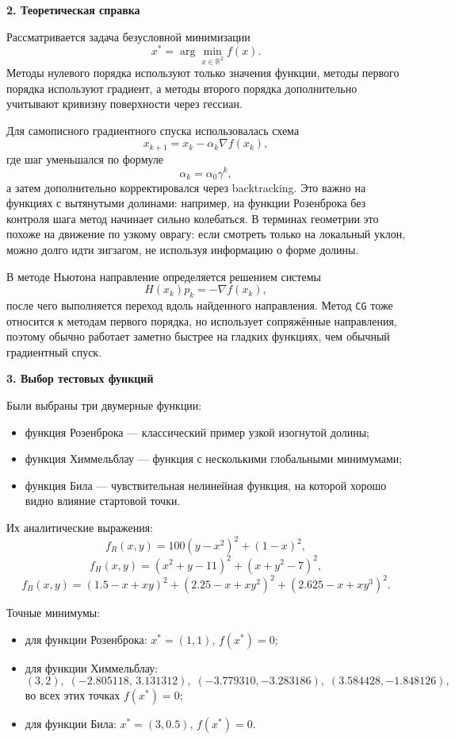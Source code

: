 \documentclass[12pt]{article}
\begin{document}
\begin{large}
\par \textbf{2. Теоретическая справка}

\par Рассматривается задача безусловной минимизации
\[
 x^* = \arg\min_{x \in \mathbb{R}^2} f(x).
\]
Методы нулевого порядка используют только значения функции, методы первого порядка используют градиент, а методы второго порядка дополнительно учитывают кривизну поверхности через гессиан.

\par Для самописного градиентного спуска использовалась схема
\[
 x_{k+1} = x_k - \alpha_k \nabla f(x_k),
\]
где шаг уменьшался по формуле
\[
\alpha_k = \alpha_0 \gamma^k,
\]
а затем дополнительно корректировался через backtracking. Это важно на функциях с вытянутыми долинами: например, на функции Розенброка без контроля шага метод начинает сильно колебаться. В терминах геометрии это похоже на движение по узкому оврагу: если смотреть только на локальный уклон, можно долго идти зигзагом, не используя информацию о форме долины.

\par В методе Ньютона направление определяется решением системы
\[
H(x_k)p_k = -\nabla f(x_k),
\]
после чего выполняется переход вдоль найденного направления. Метод \texttt{CG} тоже относится к методам первого порядка, но использует сопряжённые направления, поэтому обычно работает заметно быстрее на гладких функциях, чем обычный градиентный спуск.

\par \textbf{3. Выбор тестовых функций}

\par Были выбраны три двумерные функции:
\begin{itemize}
    \item функция Розенброка --- классический пример узкой изогнутой долины;
    \item функция Химмельблау --- функция с несколькими глобальными минимумами;
    \item функция Била --- чувствительная нелинейная функция, на которой хорошо видно влияние стартовой точки.
\end{itemize}

\par Их аналитические выражения:
\[
 f_{R}(x,y)=100(y-x^2)^2+(1-x)^2,
\]
\[
 f_{H}(x,y)=(x^2+y-11)^2+(x+y^2-7)^2,
\]
\[
 f_{B}(x,y)=(1.5-x+xy)^2+(2.25-x+xy^2)^2+(2.625-x+xy^3)^2.
\]

\par Точные минимумы:
\begin{itemize}
    \item для функции Розенброка: $x^*=(1,1)$, $f(x^*)=0$;
    \item для функции Химмельблау:
    \[ (3,2),\; (-2.805118,\,3.131312),\; (-3.779310,-3.283186),\; (3.584428,-1.848126), \]
    во всех этих точках $f(x^*)=0$;
    \item для функции Била: $x^*=(3,0.5)$, $f(x^*)=0$.
\end{itemize}


\end{large}
\end{document}
